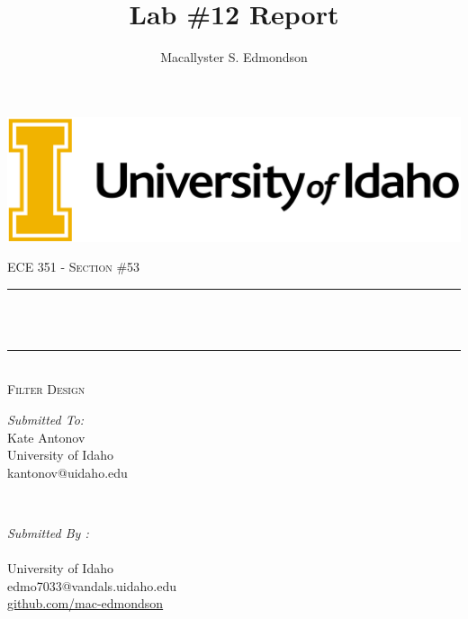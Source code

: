 \documentclass[12pt]{report}
\title{Lab \#12 Report}
\author{Macallyster S. Edmondson}
\date{\longdate\displaydate{date}}
\makeatletter
\let\thetitle\@title
\let\theauthor\@author
\makeatother
\begin{document}
\begin{titlepage}\thispagestyle{titlepage}
\centering
\includegraphics[scale = 0.12]{univ-logo.png}\\[1.0 cm]
\begin{center}    \textsc{\Large   ECE 351 - Section \#53 }\\[2.0 cm]
\end{center}%

\rule{\linewidth}{0.2 mm} \\[0.4 cm]
{ \huge \bfseries \thetitle}\\
\rule{\linewidth}{0.2 mm} \\[0.5 cm]
\textsc{\Large Filter Design }\\[1.5 cm] %
\begin{minipage}{0.4\textwidth}
\begin{flushleft} \large
\emph{Submitted To:}\\
Kate Antonov\\ \small
University of Idaho\\
kantonov@uidaho.edu\\
\hfill
\end{flushleft}
\end{minipage}~
\begin{minipage}{0.4\textwidth}
\begin{flushright} \large
\emph{Submitted By :} \\
\theauthor \\ \small
University of Idaho\\
edmo7033@vandals.uidaho.edu\\
\href{http://github.com/mac-edmondson}{github.com/mac-edmondson}\\
\end{flushright}
\end{minipage}\\[2 cm]
\vfill
\end{titlepage}
\tableofcontents\thispagestyle{customplain}
\pagebreak
\renewcommand{\thesection}{\arabic{section}}
\end{document}
